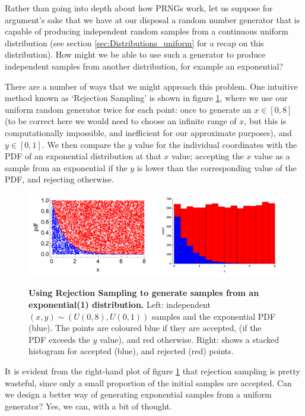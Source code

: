 \documentclass[11pt,fullpage]{book}
\begin{document}
Rather than going into depth about how PRNGs work, let us suppose for argument's sake that we have at our disposal a random number generator that is capable of producing independent random samples from a continuous uniform distribution (see section \ref{sec:Distributions_uniform} for a recap on this distribution). How might we be able to use such a generator to produce independent samples from another distribution, for example an exponential?

There are a number of ways that we might approach this problem. One intuitive method known as `Rejection Sampling' is shown in figure \ref{fig:MCMC_rejectionSamplingExponential}, where we use our uniform random generator twice for each point: once to generate an $x\in[0,8]$ (to be correct here we would need to choose an infinite range of $x$, but this is computationally impossible, and inefficient for our approximate purposes), and $y\in [0,1]$. We then compare the $y$ value for the individual coordinates with the PDF of an exponential distribution at that $x$ value; accepting the $x$ value as a sample from an exponential if the $y$ is lower than the corresponding value of the PDF, and rejecting otherwise.

\begin{figure}
\centering
\scalebox{0.4} 
{\includegraphics{MCMC_rejectionSamplingExponential.pdf}}
\caption{\textbf{Using Rejection Sampling to generate samples from an exponential(1) distribution.} Left: independent $(x,y)\sim (U(0,8),U(0,1))$ samples and the exponential PDF (blue). The points are coloured blue if they are accepted, (if the PDF exceeds the $y$ value), and red otherwise. Right: shows a stacked histogram for accepted (blue), and rejected (red) points.}\label{fig:MCMC_rejectionSamplingExponential}
\end{figure}


It is evident from the right-hand plot of figure \ref{fig:MCMC_rejectionSamplingExponential} that rejection sampling is pretty wasteful, since only a small proportion of the initial samples are accepted. Can we design a better way of generating exponential samples from a uniform generator? Yes, we can, with a bit of thought.
\end{document}
